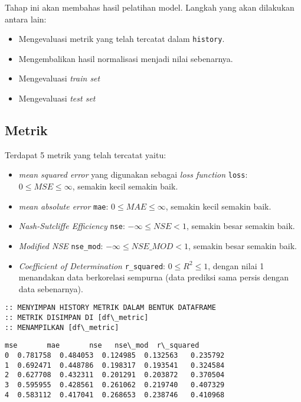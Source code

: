 \documentclass[11pt]{article}
\makeatletter
\providecommand{\tightlist}{%
      \setlength{\itemsep}{0pt}\setlength{\parskip}{0pt}}
\newcommand{\boxspacing}{\kern\kvtcb@left@rule\kern\kvtcb@boxsep}
\newcommand{\prompt}[4]{
        \ttfamily\llap{{\color{#2}[#3]:\hspace{3pt}#4}}\vspace{-\baselineskip}
    }
\makeatother
\begin{document}
Tahap ini akan membahas hasil pelatihan model. Langkah yang akan
dilakukan antara lain:

\begin{itemize}
\tightlist
\item
  Mengevaluasi metrik yang telah tercatat dalam \texttt{history}.
\item
  Mengembalikan hasil normalisasi menjadi nilai sebenarnya.
\item
  Mengevaluasi \emph{train set}
\item
  Mengevaluasi \emph{test set}
\end{itemize}

    \hypertarget{metrik}{%
\subsection{Metrik}\label{metrik}}

    Terdapat 5 metrik yang telah tercatat yaitu:

\begin{itemize}
\tightlist
\item
  \emph{mean squared error} yang digunakan sebagai \emph{loss function}
  \texttt{loss}: \(0 \leq MSE \leq \infty\), semakin kecil semakin baik.
\item
  \emph{mean absolute error} \texttt{mae}: \(0 \leq MAE \leq \infty\),
  semakin kecil semakin baik.
\item
  \emph{Nash-Sutcliffe Efficiency} \texttt{nse}:
  \(-\infty \leq NSE < 1\), semakin besar semakin baik.
\item
  \emph{Modified NSE} \texttt{nse\_mod}: \(-\infty \leq NSE\_MOD < 1\),
  semakin besar semakin baik.
\item
  \emph{Coefficient of Determination} \texttt{r\_squared}:
  \(0 \leq R^2 \leq 1\), dengan nilai 1 menandakan data berkorelasi
  sempurna (data prediksi sama persis dengan data sebenarnya).
\end{itemize}

    \begin{Verbatim}[commandchars=\\\{\}]
:: MENYIMPAN HISTORY METRIK DALAM BENTUK DATAFRAME
:: METRIK DISIMPAN DI [df\_metric]
:: MENAMPILKAN [df\_metric]
    \end{Verbatim}

            \begin{tcolorbox}[breakable, size=fbox, boxrule=.5pt, pad at break*=1mm, opacityfill=0]
\prompt{Out}{outcolor}{0}{\boxspacing}
\begin{Verbatim}[commandchars=\\\{\}]
        mse       mae       nse   nse\_mod  r\_squared
0  0.781758  0.484053  0.124985  0.132563   0.235792
1  0.692471  0.448786  0.198317  0.193541   0.324584
2  0.627708  0.432311  0.201291  0.203872   0.370504
3  0.595955  0.428561  0.261062  0.219740   0.407329
4  0.583112  0.417041  0.268653  0.238746   0.410968
\end{Verbatim}
\end{tcolorbox}
        
\end{document}
